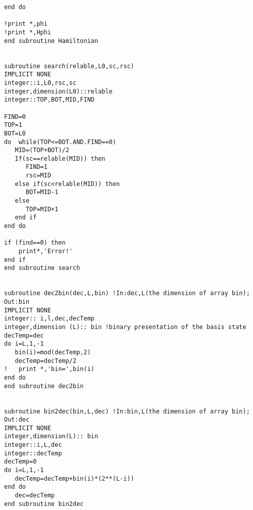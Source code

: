 \documentclass{article}
\begin{document}
\begin{verbatim}
end do

!print *,phi
!print *,Hphi
end subroutine Hamiltonian


subroutine search(relable,L0,sc,rsc)
IMPLICIT NONE
integer::i,L0,rsc,sc
integer,dimension(L0)::relable
integer::TOP,BOT,MID,FIND

FIND=0
TOP=1
BOT=L0
do  while(TOP<=BOT.AND.FIND==0)
   MID=(TOP+BOT)/2
   If(sc==relable(MID)) then
      FIND=1
      rsc=MID
   else if(sc<relable(MID)) then
      BOT=MID-1
   else
      TOP=MID+1
   end if
end do

if (find==0) then
    print*,'Error!'
end if
end subroutine search


subroutine dec2bin(dec,L,bin) !In:dec,L(the dimension of array bin); Out:bin
IMPLICIT NONE
integer:: i,l,dec,decTemp
integer,dimension (L):: bin !binary presentation of the basis state
decTemp=dec
do i=L,1,-1
   bin(i)=mod(decTemp,2)
   decTemp=decTemp/2
!   print *,'bin=',bin(i)
end do 
end subroutine dec2bin


subroutine bin2dec(bin,L,dec) !In:bin,L(the dimension of array bin); Out:dec
IMPLICIT NONE
integer,dimension(L):: bin
integer::i,L,dec
integer::decTemp
decTemp=0
do i=L,1,-1
   decTemp=decTemp+bin(i)*(2**(L-i))
end do
   dec=decTemp
end subroutine bin2dec
\end{verbatim}
\end{document}
